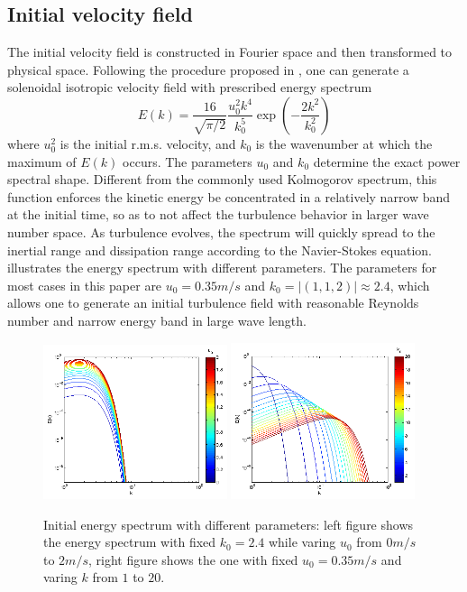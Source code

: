 \documentclass[draft,jgrga]{AGUTeX}
\begin{document}
\begin{article}
\subsection{Initial velocity field}   
The initial velocity field is constructed in Fourier space and then transformed to physical space. Following the procedure proposed in \cite{Rogallo81}, one can generate a solenoidal isotropic velocity field with prescribed energy spectrum \cite{Rosales05}
\begin{equation}
E(k) = \frac{16}{\sqrt{\pi/2}}\frac{u_0^2k^4}{k_0^5}\exp(-\frac{2k^2}{k_0^2})
\end{equation}
where $u_0^2$ is the initial r.m.s. velocity, and $k_0$ is the wavenumber at which the maximum of $E(k)$ occurs. The parameters $u_0$ and $k_0$ determine the exact power spectral shape. Different from the commonly used Kolmogorov spectrum, this function enforces the kinetic energy be concentrated in a relatively narrow band at the initial time, so as to not affect the turbulence behavior in larger wave number space. As turbulence evolves, the spectrum will quickly spread to the inertial range and dissipation range according to the Navier-Stokes equation.  illustrates the energy spectrum with different parameters. The parameters for most cases in this paper are $u_0 = 0.35m/s$ and $k_0 = |(1,1,2)| \approx 2.4$, which allows one to generate an initial turbulence field with reasonable Reynolds number and narrow energy band in large wave length.
\begin{figure}
\includegraphics[width=0.48\textwidth]{Figures/eng_spr_u}
\includegraphics[width=0.48\textwidth]{Figures/eng_spr_k}
\caption{Initial energy spectrum with different parameters: left figure shows the energy spectrum with fixed $k_0 = 2.4$ while varing $u_0$ from $0m/s$ to $2m/s$, right figure shows the one with fixed $u_0 = 0.35m/s$ and varing $k$ from $1$ to $20$.\label{fig:eng_spr}}
\end{figure}


\end{article}
\end{document}
